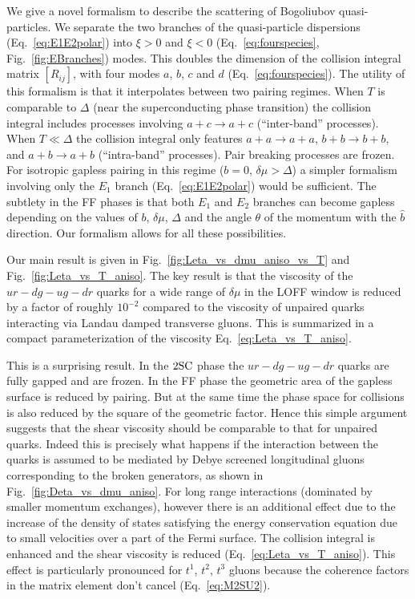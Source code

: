 \documentclass[10pt, aps, prd, superscriptaddress, nofootinbib, 
               amsmath, amssymb, twocolumn,
               preprintnumbers, showpacs,
               raggedbottom,
               floatfix]{revtex4-1}
\newcommand{\SC}{{\rm{SC}}}
\begin{document}
We give a novel formalism to describe the scattering of Bogoliubov
quasi-particles. We separate the two branches of the quasi-particle dispersions
(Eq.~\ref{eq:E1E2polar}) into $\xi>0$ and $\xi<0$ (Eq.~\ref{eq:fourspecies},
Fig.~\ref{fig:EBranches}) modes.  This
doubles the dimension of the collision integral matrix $[R_{ij}]$, with four modes
$a$, $b$, $c$ and $d$ (Eq.~\ref{eq:fourspecies}). The utility of this formalism is
that it interpolates between two pairing regimes. When $T$ is comparable to
$\Delta$ (near the superconducting phase transition) the collision integral
includes processes involving $a+c\rightarrow a+c$ (``inter-band'' processes).
When $T\ll\Delta$ the collision integral only features $a+a\rightarrow a+a$,
$b+b\rightarrow b+b$, and $a+b\rightarrow a+b$ (``intra-band'' processes).
Pair breaking processes are frozen. For isotropic gapless pairing in this
regime ($b=0$, $\delta\mu>\Delta$) a simpler
formalism involving only the $E_1$ branch (Eq.~\ref{eq:E1E2polar}) would be
sufficient. The subtlety in the FF phases is that both $E_1$ and $E_2$
branches can become gapless depending on the values of $b$, $\delta\mu$,
$\Delta$ and the angle $\theta$ of the momentum with the $\hat{b}$ direction.
Our formalism allows for all these possibilities.

Our main result is given in
Fig.~\ref{fig:Leta_vs_dmu_aniso_vs_T} and Fig.~\ref{fig:Leta_vs_T_aniso}. The key result is
that the viscosity of the $ur-dg-ug-dr$ quarks for a wide range of $\delta\mu$
in the LOFF window is reduced by a factor of roughly $10^{-2}$ compared to the
viscosity of unpaired quarks interacting via Landau damped transverse gluons.
This is summarized in a compact parameterization of the viscosity
Eq.~\ref{eq:Leta_vs_T_aniso}.

This is a surprising result. In the $2\SC$ phase the $ur-dg-ug-dr$ quarks are
fully gapped and are frozen. In the FF phase the geometric area of the gapless
surface is reduced by pairing. But at the same time the phase space for
collisions is also reduced by the square of the geometric factor. Hence this
simple argument suggests that the shear viscosity should be comparable to that
for unpaired quarks. Indeed this is precisely what happens if the interaction
between the quarks is assumed to be mediated by Debye screened longitudinal
gluons corresponding to the broken generators, as shown in
Fig.~\ref{fig:Deta_vs_dmu_aniso}. For long range interactions (dominated by
smaller momentum exchanges), however there is an additional effect due to the
increase of the density of states satisfying the energy conservation equation
due to small velocities over a part of the Fermi surface. The collision
integral is enhanced and the shear viscosity is reduced
(Eq.~\ref{eq:Leta_vs_T_aniso}). This effect is particularly pronounced for
$t^1$, $t^2$, $t^3$ gluons because the coherence factors in the matrix element 
don't cancel (Eq.~\ref{eq:M2SU2}).
\end{document}

